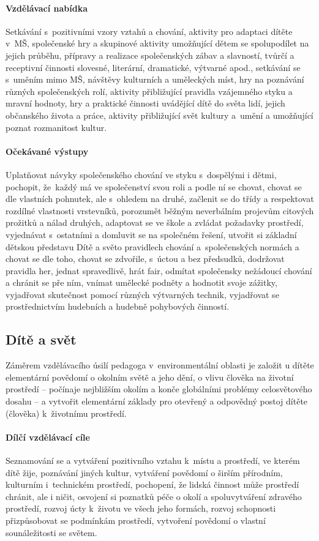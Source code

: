 					\paragraph{Vzdělávací nabídka}
						Setkávání s pozitivními vzory vztahů a chování, aktivity pro adaptaci dítěte v MŠ, společenské hry a skupinové aktivity umožňující dětem se spolupodílet na jejich průběhu, přípravy a realizace společenských zábav a slavností, tvůrčí a receptivní činnosti slovesné, literární, dramatické, výtvarné apod., setkávání se s uměním mimo MŠ, návštěvy kulturních a uměleckých míst, hry na poznávání různých společenských rolí, aktivity přibližující pravidla vzájemného styku a mravní hodnoty, hry a praktické činnosti uvádějící dítě do světa lidí, jejich občanského života a práce, aktivity přibližující svět kultury a umění a umožňující poznat rozmanitost kultur.
					\paragraph{Očekávané výstupy}
						Uplatňovat návyky společenského chování ve styku s dospělými i dětmi, pochopit, že každý má ve společenství svou roli a podle ní se chovat, chovat se dle vlastních pohnutek, ale s ohledem na druhé, začlenit se do třídy a respektovat rozdílné vlastnosti vrstevníků, porozumět běžným neverbálním projevům citových prožitků a nálad druhých, adaptovat se ve škole a zvládat požadavky prostředí, vyjednávat s ostatními a domluvit se na společném řešení, utvořit si základní dětskou představu Dítě a světo pravidlech chování a společenských normách a chovat se dle toho, chovat se zdvořile, s úctou a bez předsudků, dodržovat pravidla her, jednat spravedlivě, hrát fair, odmítat společensky nežádoucí chování a chránit se pře ním, vnímat umělecké podněty a hodnotit svoje zážitky, vyjadřovat skutečnost pomocí různých výtvarných technik, vyjadřovat se prostřednictvím hudebních a hudebně pohybových činností.

			\subsection{Dítě a svět}
				Záměrem vzdělávacího úsilí pedagoga v environmentální oblasti je založit u dítěte elementární povědomí o okolním světě a jeho dění, o vlivu člověka na životní prostředí – počínaje nejbližším okolím a konče globálními problémy celosvětového dosahu – a vytvořit elementární základy pro otevřený a odpovědný postoj dítěte (člověka) k životnímu prostředí.

				\paragraph{Dílčí vzdělávací cíle}
					Seznamování se a vytváření pozitivního vztahu k místu a prostředí, ve kterém dítě žije, poznávání jiných kultur, vytváření povědomí o širším přírodním, kulturním i technickém prostředí, pochopení, že lidská činnost může prostředí chránit, ale i ničit, osvojení si poznatků péče o okolí a spoluvytváření zdravého prostředí, rozvoj úcty k životu ve všech jeho formách, rozvoj schopnosti přizpůsobovat se podmínkám prostředí, vytvoření povědomí o vlastní sounáležitosti se světem.
